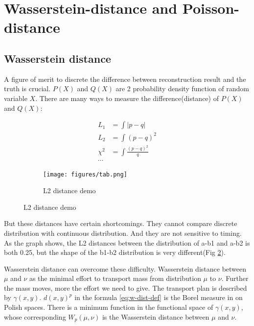 \section{Wasserstein-distance and Poisson-distance} %
\subsection{Wasserstein distance}
A figure of merit to discrete the difference between reconstruction result and the truth is crucial. $P(X)$ and $Q(X)$ are 2 probability density function of random variable $X$. There are many ways to measure the difference(distance) of $P(X)$ and $Q(X)$: 

\begin{figure}[H]
\begin{minipage}{.5\textwidth}
\begin{align*}
    L_{1} &= \int|p-q| \\
    L_{2} &= \int(p-q)^{2} \\
    \chi^{2} &= \int\frac{(p-q)^{2}}{q} \\
    \cdots
\end{align*}
\end{minipage}
\begin{minipage}{.5\textwidth}
\begin{figure}[H]
    \centering
    \texttt{[image: figures/tab.png]}
    \caption{L2 distance demo}
    \label{fig:l2}
\end{figure}
\end{minipage}
\end{figure}

But these distances have certain shortcomings. They cannot compare discrete distribution with continuous distribution. And they are not sensitive to timing. As the graph shows, the L2 distances between the distribution of a-b1 and a-b2 is both 0.25, but the shape of the b1-b2 distribution is very different(Fig \ref{fig:l2}). 

Wasserstein distance can overcome these difficulty. Wasserstein distance between $\mu$ and $\nu$ as the minimal effort to transport mass from distribution $\mu$ to $\nu$. Further the mass moves, more the effort we need to give. The transport plan is described by $\gamma(x, y)$. $d(x,y)^{p}$ in the formula \ref{eq:w-dist-def} is the Borel measure in
on Polish spaces. There is a minimum function in the functional space of $\gamma(x, y)$, whose corresponding $W_{p}(\mu ,\nu)$ is the Wasserstein distance between $\mu$ and $\nu$. 

